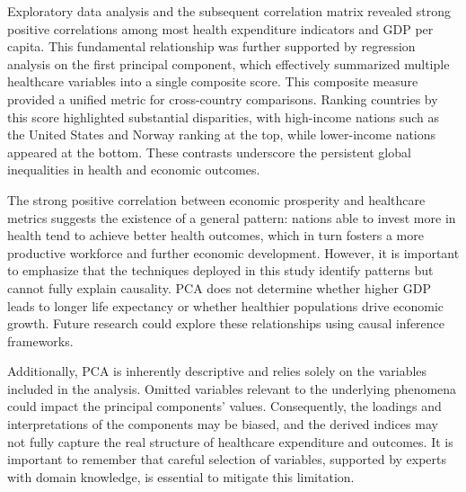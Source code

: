 \documentclass[11pt, a4paper]{article}
\begin{document}
Exploratory data analysis and the subsequent correlation matrix revealed strong positive correlations among most health expenditure indicators and GDP per capita. This fundamental relationship was further supported by regression analysis on the first principal component, which effectively summarized multiple healthcare variables into a single composite score. This composite measure provided a unified metric for cross-country comparisons. Ranking countries by this score highlighted substantial disparities, with high-income nations such as the United States and Norway ranking at the top, while lower-income nations appeared at the bottom. These contrasts underscore the persistent global inequalities in health and economic outcomes.  

The strong positive correlation between economic prosperity and healthcare metrics suggests the existence of a general pattern: nations able to invest more in health tend to achieve better health outcomes, which in turn fosters a more productive workforce and further economic development. However, it is important to emphasize that the techniques deployed in this study identify patterns but cannot fully explain causality. PCA does not determine whether higher GDP leads to longer life expectancy or whether healthier populations drive economic growth. Future research could explore these relationships using causal inference frameworks.  

Additionally, PCA is inherently descriptive and relies solely on the variables included in the analysis. Omitted variables relevant to the underlying phenomena could impact the principal components' values. Consequently, the loadings and interpretations of the components may be biased, and the derived indices may not fully capture the real structure of healthcare expenditure and outcomes. It is important to remember that careful selection of variables, supported by experts with domain knowledge, is essential to mitigate this limitation. 


\printbibliography
\end{document}
